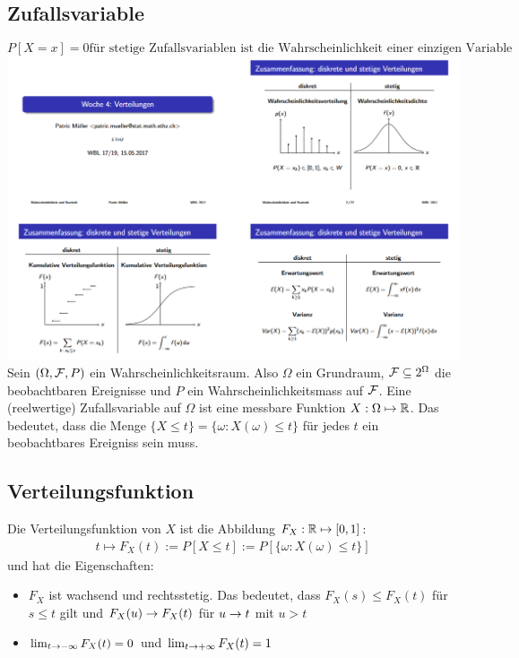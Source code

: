\subsection{Zufallsvariable}
\[
P[X = x] = 0 \text{für stetige Zufallsvariablen ist die Wahrscheinlichkeit einer einzigen Variable gleich 0} 
\]
\includegraphics[width=\columnwidth]{diskrete_stetige_verteilung.png}\\
Sein $ (\Omega, \mathcal{F}, P)$ ein Wahrscheinlichkeitsraum. Also $\Omega$ ein
Grundraum, $\mathcal{F} \subseteq 2^\Omega$ die beobachtbaren Ereignisse und $P$ ein
Wahrscheinlichkeitsmass auf $\mathcal{F}$. Eine (reelwertige) Zufallsvariable auf
$\Omega$ ist eine messbare Funktion $X : \Omega \mapsto \mathbb{R}$. Das bedeutet, dass
die Menge $\{X \leq t\} = \{\omega : X (\omega) \leq t\}$ für jedes $t$ ein
beobachtbares Ereigniss sein muss.
\subsection{Verteilungsfunktion}
Die Verteilungsfunktion von $X$ ist die Abbildung $F_X : \mathbb{R} \mapsto [0, 1]$:
\begin{align*}
  t \mapsto F_X (t) := P[X \leq t] := P[\{\omega : X (\omega) \leq t\}]
\end{align*}
und hat die Eigenschaften:
\begin{itemize}
  \item $F_X$ ist wachsend und rechtsstetig. Das bedeutet,
        dass $F_X (s) \leq F_X (t)$ für $s \leq t$ gilt und $F_X (u) \rightarrow F_X (t)$
        für $u \rightarrow t$ mit $u > t$
  \item $\lim_{t \rightarrow - \infty} F_X (t) = 0$ und $\lim_{t \rightarrow + \infty} F_X (t) = 1$
\end{itemize}
\BoxStart{}
